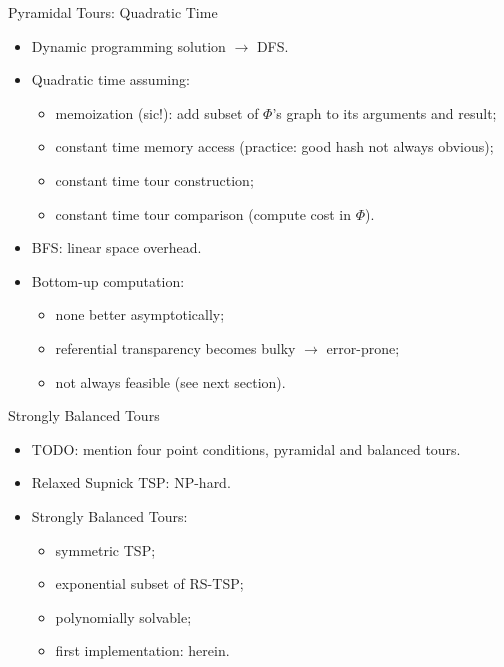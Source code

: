 \documentclass[
  size=8pt,
  style=klope,
  paper=screen,
  pauseslide,
  nopagebreaks,
  hlsections,
  fleqn
]{powerdot}
\def\todo{\color{red}}
\begin{document}
\begin{slide}[toc=Dynamic Programming${,}$ Recursion and Complexity]{Pyramidal Tours: Quadratic Time}
  \begin{itemize}
  \item
  Dynamic programming solution $\rightarrow$ DFS.
  \item
  Quadratic time assuming:
  \begin{itemize}
    \item memoization (sic!): add subset of $\Phi$'s graph to its arguments and result;
    \item constant time memory access (practice: good hash not always obvious);
    \item constant time tour construction;
    \item constant time tour comparison (compute cost in $\Phi$).
  \end{itemize}
  \item
  BFS: linear space overhead.
  \item
  Bottom-up computation:
  \begin{itemize}
    \item
    none better asymptotically;
    \item
    referential transparency becomes bulky $\rightarrow$ error-prone;
    \item
    not always feasible (see next section).
  \end{itemize}
  \end{itemize}
\end{slide}

\begin{slide}{Strongly Balanced Tours}
  \begin{itemize}
  \item
  {\todo TODO:} mention four point conditions, pyramidal and balanced tours.
  \item
  Relaxed Supnick TSP: NP-hard.
  \item
  Strongly Balanced Tours:
    \begin{itemize}
    \item symmetric TSP;
    \item exponential subset of RS-TSP;
    \item polynomially solvable;
    \item first implementation: herein.
    \end{itemize}
  \end{itemize}
\end{slide}
\end{document}
